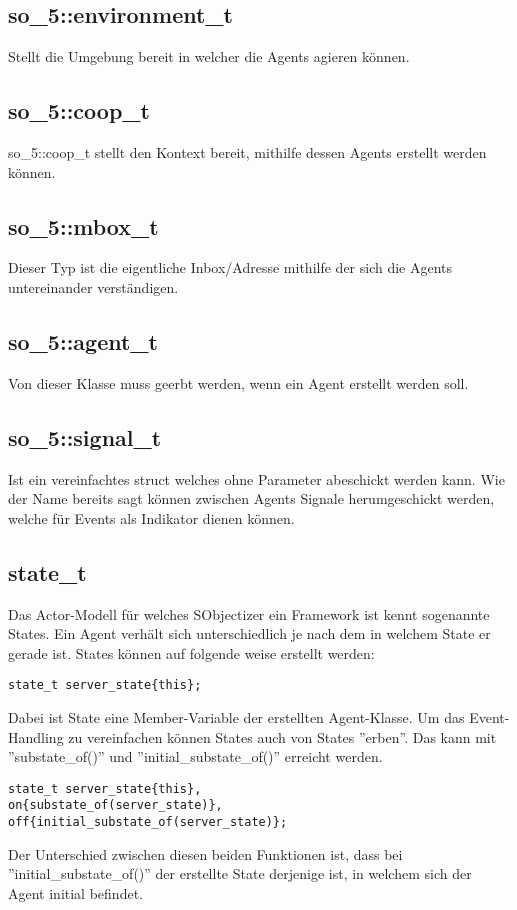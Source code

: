 \subsection{so\_5::environment\_t}
Stellt die Umgebung bereit in welcher die Agents agieren können.

\subsection{so\_5::coop\_t}
so\_5::coop\_t stellt den Kontext bereit, mithilfe dessen Agents erstellt werden können.

\subsection{so\_5::mbox\_t}
Dieser Typ ist die eigentliche Inbox/Adresse mithilfe der sich die Agents untereinander verständigen.

\subsection{so\_5::agent\_t}
Von dieser Klasse muss geerbt werden, wenn ein Agent erstellt werden soll.

\subsection{so\_5::signal\_t}
Ist ein vereinfachtes struct welches ohne Parameter abeschickt werden kann. Wie der Name bereits sagt können
zwischen Agents Signale herumgeschickt werden, welche für Events als Indikator dienen können.

\subsection{state\_t}
Das Actor-Modell für welches SObjectizer ein Framework ist kennt sogenannte States. Ein Agent verhält sich
unterschiedlich je nach dem in welchem State er gerade ist.
States können auf folgende weise erstellt werden:
\begin{verbatim}
state_t server_state{this};
\end{verbatim}
Dabei ist State eine Member-Variable der erstellten Agent-Klasse.
Um das Event-Handling zu vereinfachen können States auch von States ''erben''.
Das kann mit ''substate\_of()'' und ''initial\_substate\_of()'' erreicht werden.
\begin{verbatim}
state_t server_state{this},
on{substate_of(server_state)},
off{initial_substate_of(server_state)};
\end{verbatim}
Der Unterschied zwischen diesen beiden Funktionen ist, dass bei ''initial\_substate\_of()'' der erstellte State
derjenige ist, in welchem sich der Agent initial befindet.

